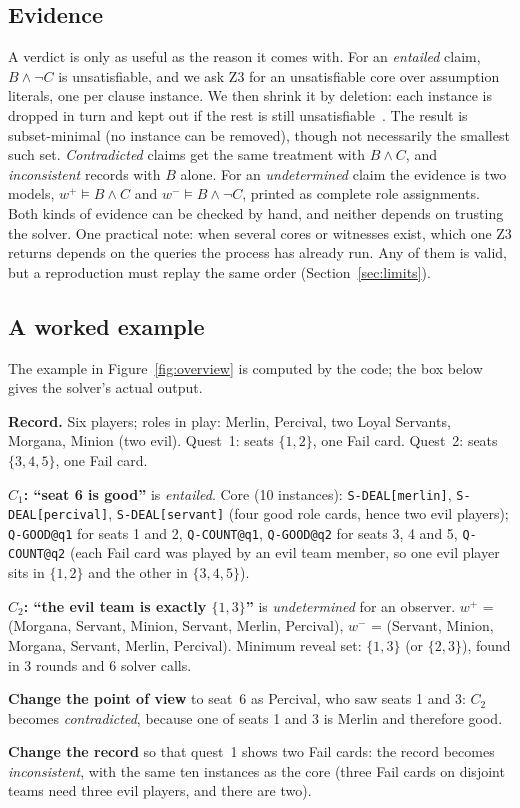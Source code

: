 \documentclass[runningheads]{llncs}
\newcommand{\cl}[1]{\texttt{#1}}
\newcommand{\vd}[1]{\emph{#1}}             %
\begin{document}
\subsection{Evidence}\label{sec:evidence}
A verdict is only as useful as the reason it comes with.
For an \vd{entailed} claim, $B\wedge\neg C$ is unsatisfiable, and we ask Z3 for an unsatisfiable core over
assumption literals, one per clause instance. We then shrink it by deletion: each instance is dropped in turn and
kept out if the rest is still unsatisfiable~\cite{liffiton2008mus,junker2004quickxplain}. The result is
subset-minimal (no instance can be removed), though not necessarily the smallest such set.
\vd{Contradicted} claims get the same treatment with $B\wedge C$, and \vd{inconsistent} records with $B$ alone.
For an \vd{undetermined} claim the evidence is two models, $w^+\models B\wedge C$ and $w^-\models B\wedge\neg C$,
printed as complete role assignments.
Both kinds of evidence can be checked by hand, and neither depends on trusting the solver.
One practical note: when several cores or witnesses exist, which one Z3 returns depends on the queries the process
has already run. Any of them is valid, but a reproduction must replay the same order (Section~\ref{sec:limits}).

\subsection{A worked example}\label{sec:example}
The example in Figure~\ref{fig:overview} is computed by the code; the box below gives the solver's actual output.

\begin{takeaway}
\textbf{Record.} Six players; roles in play: Merlin, Percival, two Loyal Servants, Morgana, Minion (two evil).
Quest~1: seats $\{1,2\}$, one Fail card. Quest~2: seats $\{3,4,5\}$, one Fail card.

\smallskip\textbf{$C_1$: ``seat 6 is good''} is \vd{entailed}. Core (10 instances):
\cl{S-DEAL[merlin]}, \cl{S-DEAL[percival]}, \cl{S-DEAL[servant]} (four good role cards, hence two evil players);
\cl{Q-GOOD@q1} for seats 1 and 2, \cl{Q-COUNT@q1}, \cl{Q-GOOD@q2} for seats 3, 4 and 5, \cl{Q-COUNT@q2} (each Fail card was
played by an evil team member, so one evil player sits in $\{1,2\}$ and the other in $\{3,4,5\}$).

\smallskip\textbf{$C_2$: ``the evil team is exactly $\{1,3\}$''} is \vd{undetermined} for an observer.
$w^+$ = (Morgana, Servant, Minion, Servant, Merlin, Percival), $w^-$ = (Servant, Minion, Morgana, Servant, Merlin,
Percival). Minimum reveal set: $\{1,3\}$ (or $\{2,3\}$), found in 3 rounds and 6 solver calls.

\smallskip\textbf{Change the point of view} to seat~6 as Percival, who saw seats 1 and 3: $C_2$ becomes
\vd{contradicted}, because one of seats 1 and 3 is Merlin and therefore good.

\smallskip\textbf{Change the record} so that quest~1 shows two Fail cards: the record becomes \vd{inconsistent}, with
the same ten instances as the core (three Fail cards on disjoint teams need three evil players, and there are two).
\end{takeaway}
\end{document}

